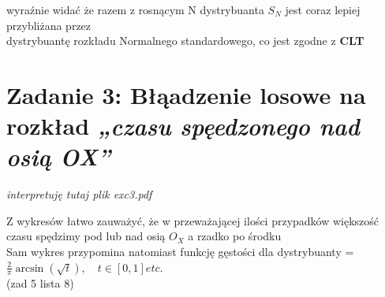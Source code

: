 \documentclass{article}
\begin{document}
wyraźnie widać że razem z rosnącym N dystrybuanta \( S_N \) jest coraz lepiej przybliżana przez \\
dystrybuantę rozkładu Normalnego standardowego, co jest zgodne z \textbf{CLT} \\

\section*{Zadanie 3: Błąadzenie losowe na  rozkład \textit{„czasu spęedzonego nad osią OX”}}

\textit{interpretuję tutaj plik exc3.pdf}

Z wykresów łatwo zauważyć, że w przeważającej ilości przypadków większość czasu spędzimy pod lub nad osią \( O_X \) a rzadko po środku\\
Sam wykres przypomina natomiast funkcję gęstości dla dystrybuanty = \\
\( \frac{2}{\pi} \arcsin\left(\sqrt{t}\right), \quad t \in [0, 1] etc. \)\\
(zad 5 lista 8)
\end{document}
